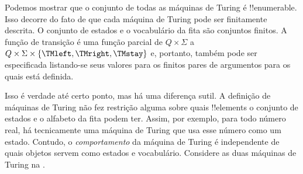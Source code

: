 \documentclass[../../../include/open-logic-section]{subfiles}
\begin{document}

\begin{explain}
Podemos mostrar que o conjunto de todas as máquinas de Turing é
!!{enumerable}. Isso decorre do fato de que cada máquina de Turing
pode ser finitamente descrita. O conjunto de estados e o vocabulário
da fita são conjuntos finitos. A função de transição é uma função
parcial de $Q \times \Sigma$ a $Q \times \Sigma \times \{\TMleft,
\TMright, \TMstay\}$ e, portanto, também pode ser especificada
listando-se seus valores para os finitos pares de argumentos para os
quais está definida.

Isso é verdade até certo ponto, mas há uma diferença sutil. A
definição de máquinas de Turing não fez restrição alguma sobre quais
!!{element}s o conjunto de estados e o alfabeto da fita podem ter.
Assim, por exemplo, para todo número real, há tecnicamente uma máquina
de Turing que usa esse número como um estado. Contudo, o
\emph{comportamento} da máquina de Turing é independente de quais
objetos servem como estados e vocabulário. Considere as duas máquinas
de Turing na .
\begin{figure}
\begin{center}
\\
\end{center}
\end{figure}
\end{explain}
\end{document}
